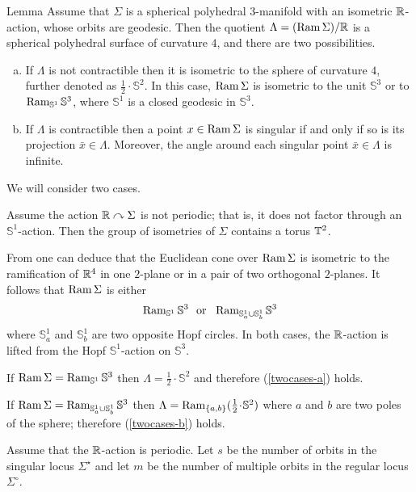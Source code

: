 \documentclass[oneside,a4paper]{article}
\begin{document}
\begin{thm}{Lemma}\label{twocases}
Assume that $\Sigma$ is a spherical polyhedral $3$-manifold
with an isometric $\mathbb{R}$-action, whose orbits are geodesic.
Then the quotient $\Lambda=(\mathop{\rm Ram}\nolimits\Sigma)/\mathbb{R}$ is a spherical polyhedral surface
of curvature $4$, and there are two possibilities.
\begin{enumerate}[(a)]
\item\label{twocases-a}
If $\Lambda$ is not contractible then it is isometric to the sphere of curvature $4$, further denoted as $\tfrac12\cdot\mathbb{S}^2$.
In this case, $\mathop{\rm Ram}\nolimits \Sigma$ is isometric to the unit $\mathbb{S}^3$ or to $\mathop{\rm Ram}\nolimits_{\mathbb{S}^1}\mathbb{S}^3$, where  $\mathbb{S}^1$ is a closed geodesic in $\mathbb{S}^3$.
\item\label{twocases-b} If $\Lambda$ is contractible
then a point $x\in \mathop{\rm Ram}\nolimits \Sigma$ is singular
if and only if so is its projection $\bar x\in \Lambda$.
Moreover, the angle around each singular point $\bar x\in \Lambda$
is infinite.
\end{enumerate}
\end{thm}

We will consider two cases.

 Assume the action $\mathbb{R}\curvearrowright\Sigma$ is not periodic;
that is, it does not factor through an $\mathbb{S}^1$-action.
Then the group of isometries of $\Sigma$ contains a torus $\mathbb{T}^2$.


From \cite[Proposition 3.9]{panov} one can deduce that the Euclidean
cone over $\mathop{\rm Ram}\nolimits\Sigma$ is isometric to the ramification of $\mathbb{R}^4$
in one $2$-plane or in a pair of two orthogonal $2$-planes.
It follows that $\mathop{\rm Ram}\nolimits \Sigma$ is either
$$\Ram_{\mathbb{S}^1}\mathbb{S}^3 \ \ \mathrm{or}\ \ \Ram_{\mathbb{S}_a^1\cup \mathbb{S}_b^1}\mathbb{S}^3$$
where $\mathbb{S}_a^1$ and $\mathbb{S}_b^1$ are two opposite Hopf circles.
In both cases, the $\mathbb{R}$-action is lifted from the Hopf $\mathbb{S}^1$-action on $\mathbb{S}^3$.

If $\mathop{\rm Ram}\nolimits \Sigma=\mathop{\rm Ram}\nolimits_{\mathbb{S}^1}\mathbb{S}^3$ then
$\Lambda=\tfrac12\cdot\mathbb{S}^2$ and therefore (\ref{twocases-a}) holds.

If $\mathop{\rm Ram}\nolimits \Sigma=\mathop{\rm Ram}\nolimits_{\mathbb{S}_a^1\cup \mathbb{S}_b^1}\mathbb{S}^3$ then  $\Lambda=\Ram_{\{a,b\}}(\tfrac12\cdot\mathbb{S}^2)$ where $a$ and $b$ are two poles of the sphere;
therefore (\ref{twocases-b}) holds.

 Assume that the $\mathbb{R}$-action is periodic.
Let $s$ be the number of orbits in the singular locus $\Sigma^{{\star}}$
and let $m$ be the number of multiple orbits in the regular locus $\Sigma^\circ$.
\end{document}
